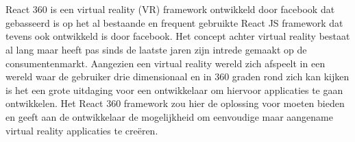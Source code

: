 
%
%

%



\chapter*{}

React 360 is een virtual reality (VR) framework ontwikkeld door facebook dat gebasseerd is op het al bestaande en frequent gebruikte React JS framework dat tevens ook ontwikkeld is door facebook. Het concept achter virtual reality bestaat al lang maar heeft pas sinds de laatste jaren zijn intrede gemaakt op de consumentenmarkt. Aangezien een virtual reality wereld zich afspeelt in een wereld waar de gebruiker drie dimensionaal en in 360 graden rond zich kan kijken is het een grote uitdaging voor een ontwikkelaar om hiervoor applicaties te gaan ontwikkelen. Het React 360 framework zou hier de oplossing voor moeten bieden en geeft aan de ontwikkelaar de mogelijkheid om eenvoudige maar aangename virtual reality applicaties te creëren.

